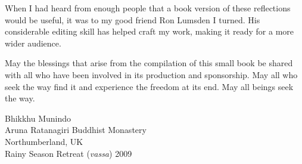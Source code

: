 When I had heard from enough people that a book version of these
reflections would be useful, it was to my good friend Ron Lumsden I
turned. His considerable editing skill has helped craft my work, making
it ready for a more wider audience.

May the blessings that arise from the compilation of this small book be
shared with all who have been involved in its production and
sponsorship.  May all who seek the way find it and experience the
freedom at its end. May all beings seek the way.

\bigskip

{\par\raggedleft
Bhikkhu Munindo\\
Aruna Ratanagiri Buddhist Monastery\\
Northumberland, UK\\
Rainy Season Retreat (\emph{vassa}) 2009
\par}


